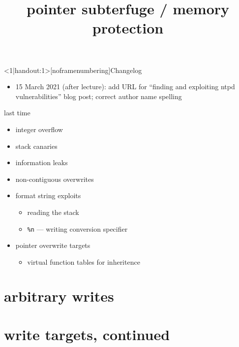 \graphicspath{{./figures/}}
\title{pointer subterfuge / memory protection}
\date{}

\begin{frame}
    \titlepage
\end{frame}

{
\begin{frame}<1|handout:1>[noframenumbering]{Changelog}
    \begin{itemize}
    \item 15 March 2021 (after lecture): add URL for ``finding and exploiting ntpd vulnerabilities'' blog post; correct author name spelling
    \end{itemize}
\end{frame}
}

\begin{frame}{last time}
    \begin{itemize}
    \item integer overflow
    \item stack canaries
    \item information leaks
    \item non-contiguous overwrites
    \item format string exploits
        \begin{itemize}
        \item reading the stack
        \item \texttt{\%n} --- writing conversion specifier
        \end{itemize}
    \item pointer overwrite targets
        \begin{itemize}
        \item virtual function tables for inheritence
        \end{itemize}
    \end{itemize}
\end{frame}


\section{arbitrary writes}


\section{write targets, continued}


